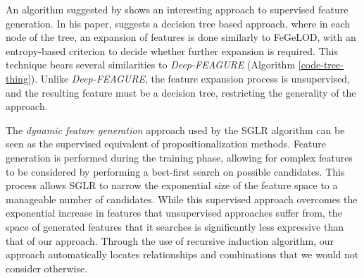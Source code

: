 \documentclass[letterpaper]{article} %
\theoremstyle{definition}
\begin{document}
An algorithm suggested by \citeauthor{terziev2011feature} shows an interesting approach to supervised feature generation. In his paper, \citeauthor{terziev2011feature} suggests a decision tree based approach, where in each node of the tree, an expansion of features is done similarly to FeGeLOD, with an entropy-based criterion to decide whether further expansion is required. This technique bears several similarities to \emph{Deep-FEAGURE} (Algorithm \ref{code-tree-thing}). Unlike \emph{Deep-FEAGURE}, the feature expansion
process is unsupervised, and the resulting feature must be a decision tree, restricting the generality
of the approach.

The \emph{dynamic feature generation} approach used by the SGLR algorithm \cite{popescul200716} can be seen as the supervised equivalent of propositionalization methods. Feature generation
is performed during the training phase, allowing for complex features to be considered by
performing a best-first search on possible candidates. This process allows SGLR to narrow the
exponential size of the feature space to a manageable number of candidates. While this supervised
approach overcomes the exponential increase in features that unsupervised approaches suffer
from, the space of generated features that it searches is significantly less expressive than that of our
approach. Through the use of recursive induction algorithm, our approach automatically locates
relationships and combinations that we would not consider otherwise.


\end{document}
